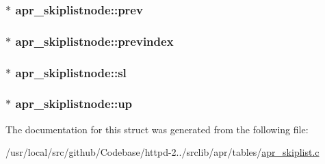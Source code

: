 \subsubsection[{\texorpdfstring{prev}{prev}}]{$\ast$ apr\+\_\+skiplistnode\+::prev}\hypertarget{structapr__skiplistnode_a6f2cc8064cd9de566c97bd8d96a18cb3}{}\label{structapr__skiplistnode_a6f2cc8064cd9de566c97bd8d96a18cb3}
\subsubsection[{\texorpdfstring{previndex}{previndex}}]{$\ast$ apr\+\_\+skiplistnode\+::previndex}\hypertarget{structapr__skiplistnode_a4e35cf089c61b3816cd224ac280105ca}{}\label{structapr__skiplistnode_a4e35cf089c61b3816cd224ac280105ca}
\subsubsection[{\texorpdfstring{sl}{sl}}]{$\ast$ apr\+\_\+skiplistnode\+::sl}\hypertarget{structapr__skiplistnode_a6d751900717292094244381e236981bf}{}\label{structapr__skiplistnode_a6d751900717292094244381e236981bf}
\subsubsection[{\texorpdfstring{up}{up}}]{$\ast$ apr\+\_\+skiplistnode\+::up}\hypertarget{structapr__skiplistnode_aed80e851506fb8e07247cfb385caf2ec}{}\label{structapr__skiplistnode_aed80e851506fb8e07247cfb385caf2ec}


The documentation for this struct was generated from the following file\+:\begin{DoxyCompactItemize}
\item 
/usr/local/src/github/\+Codebase/httpd-\/2../srclib/apr/tables/\hyperlink{apr__skiplist_8c}{apr\+\_\+skiplist.\+c}\end{DoxyCompactItemize}
